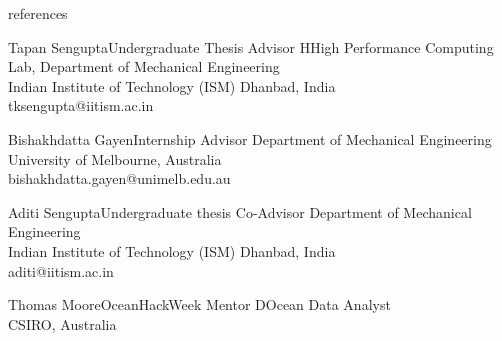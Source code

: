 \documentclass{resume} %
\begin{document}
\begin{rSection}{references}

\begin{rSubsection}{Tapan Sengupta}{Undergraduate Thesis Advisor}{}
HHigh Performance Computing Lab, Department of Mechanical Engineering\\
Indian Institute of Technology (ISM) Dhanbad, India\\
tksengupta@iitism.ac.in\\

\end{rSubsection}

\begin{rSubsection}{Bishakhdatta Gayen}{Internship Advisor}{}
Department of Mechanical Engineering\\
University of Melbourne, Australia\\
bishakhdatta.gayen@unimelb.edu.au\\

\end{rSubsection}

\begin{rSubsection}{Aditi Sengupta}{Undergraduate thesis Co-Advisor}{}
Department of Mechanical Engineering\\
Indian Institute of Technology (ISM) Dhanbad, India\\
aditi@iitism.ac.in\\

\end{rSubsection}

\begin{rSubsection}{Thomas Moore}{OceanHackWeek Mentor}{}
DOcean Data Analyst\\
CSIRO, Australia\\
\href{https://people.csiro.au/M/T/Thomas-Moore}\\

\end{rSubsection}

\end{rSection}





\end{document}
